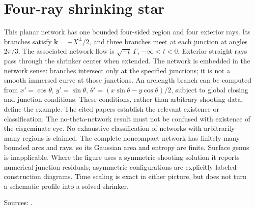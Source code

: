 \chapter{Four-ray shrinking star}\label{sec:catalogue-network-four-ray}
\begin{example}\label{ex:catalogue-network-four-ray}
This planar network has one bounded four-sided region and four exterior rays. Its branches satisfy $\mathbf k=-X^\perp/2$, and three branches meet at each junction at angles $2\pi/3$. The associated network flow is $\sqrt{-t}\,\Gamma$, $-\infty<t<0$. Exterior straight rays pass through the shrinker center when extended. The network is embedded in the network sense: branches intersect only at the specified junctions; it is not a smooth immersed curve at those junctions.
An arclength branch can be computed from $x'=\cos\theta$, $y'=\sin\theta$, $\theta'=(x\sin\theta-y\cos\theta)/2$, subject to global closing and junction conditions. These conditions, rather than arbitrary shooting data, define the example. The cited papers establish the relevant existence or classification. The no-theta-network result must not be confused with existence of the cisgeminate eye. No exhaustive classification of networks with arbitrarily many regions is claimed.
The complete noncompact network has finitely many bounded arcs and rays, so its Gaussian area and entropy are finite. Surface genus is inapplicable. Where the figure uses a symmetric shooting solution it reports numerical junction residuals; asymmetric configurations are explicitly labeled construction diagrams. Time scaling is exact in either picture, but does not turn a schematic profile into a solved shrinker.
\par Sources: \cite{CatChang2026,CatChenGuo2007}.
\end{example}

